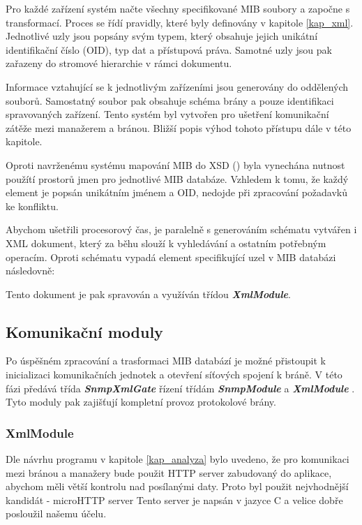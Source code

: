 Pro každé zařízení systém načte všechny specifikované MIB soubory a započne s transformací. Proces se řídí pravidly, které byly definovány v kapitole \ref{kap_xml}.
Jednotlivé uzly jsou popsány svým typem, který obsahuje jejich unikátní identifikační číslo (OID), typ dat a přístupová práva. Samotné uzly jsou pak zařazeny
do stromové hierarchie v rámci dokumentu.

Informace vztahující se k jednotlivým zařízeními jsou generovány do oddělených souborů. Samostatný soubor
pak obsahuje schéma brány a pouze identifikaci spravovaných zařízení. Tento systém byl vytvořen pro ušetření komunikační zátěže mezi manažerem a bránou.
Bližší popis výhod tohoto přístupu dále v této kapitole.

Oproti navrženému systému mapování MIB do XSD (\cite{macejko_dipl}) byla vynechána nutnost použítí prostorů jmen pro jednotlivé MIB databáze. Vzhledem
k tomu, že každý element je popsán unikátním jménem a OID, nedojde při zpracování požadavků ke konfliktu.

Abychom ušetřili procesorový čas, je paralelně s generováním schématu vytvářen i XML dokument, který za běhu slouží k vyhledávání a ostatním potřebným
operacím. Oproti schématu vypadá element specifikující uzel v MIB databázi následovně:

Tento dokument je pak spravován a využíván třídou \textit{\textbf{XmlModule}}.


\subsection{Komunikační moduly}
Po úspěšném zpracování a trasformaci MIB databází je možné přistoupit k inicializaci komunikačních jednotek a otevření síťových spojení k bráně.
V této fázi předává třída \textit{ \textbf{SnmpXmlGate} } řízení třídám \textit{ \textbf{SnmpModule} } a \textit{ \textbf{XmlModule} }. Tyto
moduly pak zajišťují kompletní provoz protokolové brány.

\subsubsection*{XmlModule}
\label{kap_impl_xmlmod}
Dle návrhu programu v kapitole \ref{kap_analyza} bylo uvedeno, že pro komunikaci mezi bránou a manažery bude použit HTTP server zabudovaný do
aplikace, abychom měli větší kontrolu nad posílanými daty. Proto byl použit nejvhodnější kandidát - microHTTP server %
Tento server je napsán v jazyce C a velice dobře posloužil našemu účelu. 

